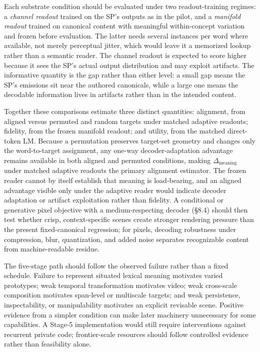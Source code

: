 \documentclass[11pt,a4paper]{article}
\begin{document}
Each substrate condition should be evaluated under two readout-training regimes: a \emph{channel readout} trained on the SP's outputs as in the pilot, and a \emph{manifold readout} trained on canonical content with meaningful within-concept variation and frozen before evaluation. The latter needs several instances per word where available, not merely perceptual jitter, which would leave it a memorized lookup rather than a semantic reader. The channel readout is expected to score higher because it sees the SP's actual output distribution and may exploit artifacts. The informative quantity is the gap rather than either level: a small gap means the SP's emissions sit near the authored canonicals, while a large one means the decodable information lives in artifacts rather than in the intended content.

Together these comparisons estimate three distinct quantities: alignment, from aligned versus permuted and random targets under matched adaptive readouts; fidelity, from the frozen manifold readout; and utility, from the matched direct-token LM. Because a permutation preserves target-set geometry and changes only the word-to-target assignment, any one-way decoder-adaptation advantage remains available in both aligned and permuted conditions, making $\Delta_{\mathrm{meaning}}$ under matched adaptive readouts the primary alignment estimator. The frozen reader cannot by itself establish that meaning is load-bearing, and an aligned advantage visible only under the adaptive reader would indicate decoder adaptation or artifact exploitation rather than fidelity. A conditional or generative pixel objective with a medium-respecting decoder (§8.4) should then test whether crisp, context-specific scenes create stronger rendering pressure than the present fixed-canonical regression; for pixels, decoding robustness under compression, blur, quantization, and added noise separates recognizable content from machine-readable residue.

The five-stage path should follow the observed failure rather than a fixed schedule. Failure to represent situated lexical meaning motivates varied prototypes; weak temporal transformation motivates video; weak cross-scale composition motivates span-level or multiscale targets; and weak persistence, inspectability, or manipulability motivates an explicit revisable scene. Positive evidence from a simpler condition can make later machinery unnecessary for some capabilities. A Stage-5 implementation would still require interventions against recurrent private code; frontier-scale resources should follow controlled evidence rather than feasibility alone.
\end{document}
